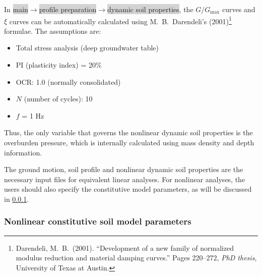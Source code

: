 \documentclass[11pt,letterpaper]{article}
\newcommand{\panel}[1]{\colorbox{lightgray}{\textsf{#1}}}
\begin{document}
In \panel{main}$\rightarrow$\panel{profile preparation}$\rightarrow$\panel{dynamic soil properties}, the $G/G_{\max}$ curves and $\xi$ curves can be automatically calculated using M.~B.~Darendeli's (2001)\footnote{Darendeli, M.~B.~(2001). ``Development of a new family of normalized modulus reduction and material damping curves.'' Pages 220--272, \emph{PhD thesis}, University of Texas at Austin.} formulae. The assumptions are:
\begin{itemize}
\item Total stress analysis (deep groundwater table)
\item PI (plasticity index) = 20\%
\item OCR: 1.0 (normally consolidated)
\item $N$ (number of cycles): 10
\item $f$ = 1 Hz
\end{itemize}

Thus, the only variable that governs the nonlinear dynamic soil properties is the overburden pressure, which is internally calculated using mass density and depth information.

The ground motion, soil profile and nonlinear dynamic soil properties are the necessary input files for equivalent linear analyses. For nonlinear analyses, the users should also specify the constitutive model parameters, as will be discussed in \ref{sec:para}.

\subsubsection{Nonlinear constitutive soil model parameters}\label{sec:para}
\end{document}

